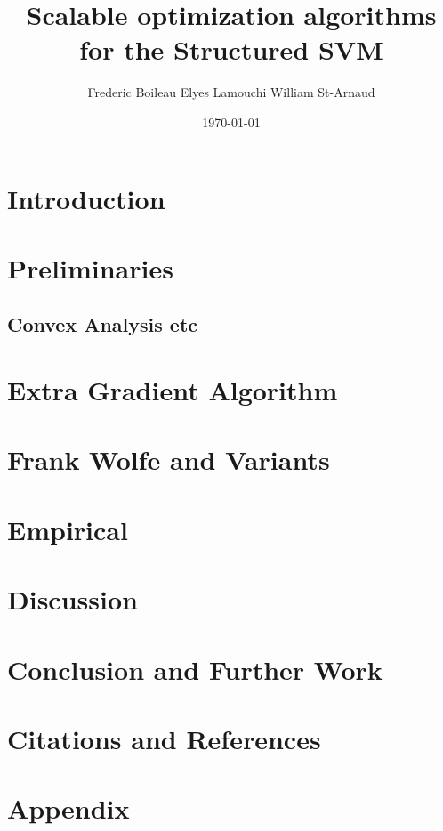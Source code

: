 

\usepackage[
  backend=biber,
  citestyle=authoryear-ibid,
  natbib=true
  ]{biblatex}
\usepackage{csquotes}
\renewcommand\nameyeardelim{, }



\title{Scalable optimization algorithms for the Structured SVM}
\date{\today}
\author{Frederic Boileau Elyes Lamouchi William St-Arnaud}

\maketitle

\clearpage
\section{Introduction}



\clearpage
\section{Preliminaries}

\clearpage


\clearpage
\subsection{Convex Analysis etc}


\clearpage
\section{Extra Gradient Algorithm}


\clearpage
\section{Frank Wolfe and Variants}


\clearpage
\section{Empirical}


\clearpage
\section{Discussion}


\clearpage
\section{Conclusion and Further Work}


\clearpage
\section{Citations and References}
\printbibliography

\clearpage
\section{Appendix}


